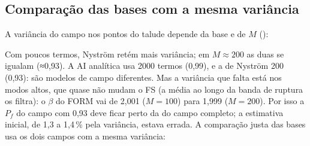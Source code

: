 \documentclass[11pt,a4paper]{article}
\begin{document}
\subsection{Comparação das bases com a mesma variância}
A variância do campo nos pontos do talude depende da base e de $M$ ():
\begin{table}[H]\centering\small
{}
\caption{Variância média do campo nos pontos do talude (alvo 1). O teto de Nyström vem da quadratura de 2400 nós: a
interpolação entre os nós não reproduz o bico do kernel exponencial.}
\end{table}
Com poucos termos, Nyström retém mais variância; em $M \approx 200$ as duas se igualam (≈0,93). A AI analítica usa 2000
termos (0,99), e a de Nyström 200 (0,93): são modelos de campo diferentes. Mas a variância que falta está nos modos
altos, que quase não mudam o FS (a média ao longo da banda de ruptura os filtra): o $\beta$ do FORM vai de 2,001
($M = 100$) para 1,999 ($M = 200$). Por isso a $P_f$ do campo com 0,93 deve ficar perto da do campo completo; a
estimativa inicial, de 1,3 a 1,4\,\% pela variância, estava errada. A comparação justa das bases usa os dois campos
com a mesma variância:
\begin{table}[H]\centering\small
{}
\caption{AI no PC, semente 3, a mesma das AI analíticas da Tabela 1 (os sorteios são os mesmos). A referência de
24\,000 é do campo completo (2000 termos) e só vale aproximadamente aqui.}
\end{table}
\end{document}

